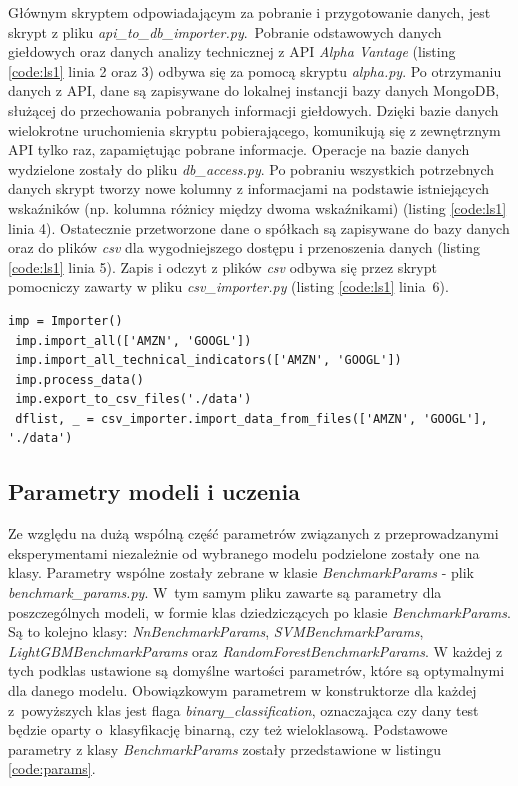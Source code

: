\documentclass[a4paper, twoside, 11pt, openright]{article}
\begin{document}
Głównym skryptem odpowiadającym za pobranie i przygotowanie danych, jest skrypt z pliku \textit{api\_to\_db\_importer.py}.~Pobranie odstawowych danych giełdowych oraz danych analizy technicznej z API \textit{Alpha Vantage} \cite{alphavantage} (listing \ref{code:ls1} linia 2 oraz 3) odbywa się za pomocą skryptu \textit{alpha.py}. Po otrzymaniu danych z API, dane są zapisywane do lokalnej instancji bazy danych MongoDB, służącej do przechowania pobranych informacji giełdowych. Dzięki bazie danych wielokrotne uruchomienia skryptu pobierającego, komunikują się z zewnętrznym API tylko raz, zapamiętując pobrane informacje. Operacje na bazie danych wydzielone zostały do pliku \textit{db\_access.py}. Po pobraniu wszystkich potrzebnych danych skrypt tworzy nowe kolumny z informacjami na podstawie istniejących wskaźników (np. kolumna różnicy między dwoma wskaźnikami) (listing \ref{code:ls1} linia 4). Ostatecznie przetworzone dane o spółkach są zapisywane do bazy danych oraz do plików \textit{csv} dla wygodniejszego dostępu i przenoszenia danych (listing \ref{code:ls1} linia 5). Zapis i odczyt z plików \textit{csv} odbywa się przez skrypt pomocniczy zawarty w pliku \textit{csv\_importer.py} (listing \ref{code:ls1} linia~6).

\begin{lstlisting}[caption={Pobranie i wstępne przetworzenie danych (plik \textit{api\_to\_db\_importer.py}).}, label={code:ls1},frame=single, captionpos=b, mathescape=true]
 imp = Importer()
 imp.import_all(['AMZN', 'GOOGL'])
 imp.import_all_technical_indicators(['AMZN', 'GOOGL'])
 imp.process_data()
 imp.export_to_csv_files('./data')
 dflist, _ = csv_importer.import_data_from_files(['AMZN', 'GOOGL'], './data')
\end{lstlisting}

\subsection*{Parametry modeli i uczenia}

Ze względu na dużą wspólną część parametrów związanych z przeprowadzanymi eksperymentami niezależnie od wybranego modelu podzielone zostały one na klasy. Parametry wspólne zostały zebrane w klasie \textit{BenchmarkParams} - plik \textit{benchmark\_params.py}. W~tym samym pliku zawarte są parametry dla poszczególnych modeli, w formie klas dziedziczących po klasie \textit{BenchmarkParams}. Są to kolejno klasy: \textit{NnBenchmarkParams}, \textit{SVMBenchmarkParams}, \textit{LightGBMBenchmarkParams} oraz \textit{RandomForestBenchmarkParams}. W każdej z tych podklas ustawione są domyślne wartości parametrów, które są optymalnymi dla danego modelu. Obowiązkowym parametrem w konstruktorze dla każdej z~powyższych klas jest flaga \textit{binary\_classification}, oznaczająca czy dany test będzie oparty o~klasyfikację binarną, czy też wieloklasową. Podstawowe parametry z klasy \textit{BenchmarkParams} zostały przedstawione w listingu \ref{code:params}.
\end{document}
